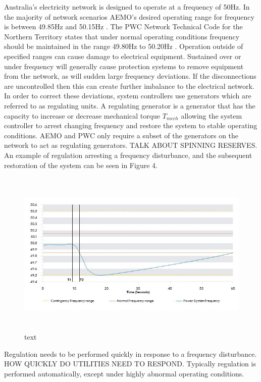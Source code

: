 \documentclass[12pt, a4paper]{article}
\begin{document}
Australia's electricity network is designed to operate at a frequency of 50$\si{\hertz}$. In the majority of network scenarios AEMO's desired operating range for frequency is between 49.85$\si{\hertz}$ and 50.15$\si{\hertz}$ \cite{AEMO2012}. The PWC Network Technical Code for the Northern Territory states that under normal operating conditions frequency should be maintained in the range 49.80$\si{\hertz}$ to 50.20$\si{\hertz}$ \cite{PWC2018}. Operation outside of specified ranges can cause damage to electrical equipment. Sustained over or under frequency will generally cause protection systems to remove equipment from the network, as will sudden large frequency deviations. If the disconnections are uncontrolled then this can create further imbalance to the electrical network. In order to correct these deviations, system controllers use generators which are referred to as regulating units. A regulating generator is a generator that has the capacity to increase or decrease mechanical torque $T_{mech}$ allowing the system controller to arrest changing frequency and restore the system to stable operating conditions. AEMO and PWC only require a subset of the generators on the network to act as regulating generators. TALK ABOUT SPINNING RESERVES. An example of regulation arresting a frequency disturbance, and the subsequent restoration of the system can be seen in Figure 4.
\begin{figure}[h]
\centering
\includegraphics[height=8cm]{frequency_arrest}
\caption{text}
\end{figure}

Regulation needs to be performed quickly in response to a frequency disturbance. HOW QUICKLY DO UTILITIES NEED TO RESPOND. Typically regulation is performed automatically, except under highly abnormal operating conditions.
\end{document}
